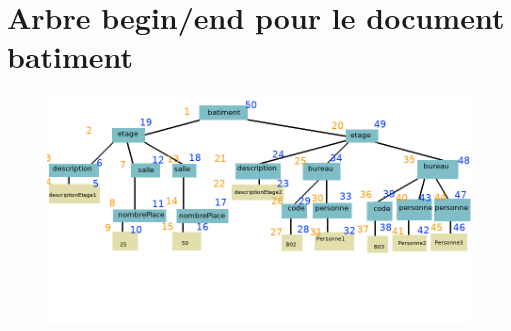 \chapter{Arbre begin/end pour le document batiment}
\begin{figure}
  \includegraphics[width=\linewidth]{batiment_begin_end_tree.png}
\end{figure}

